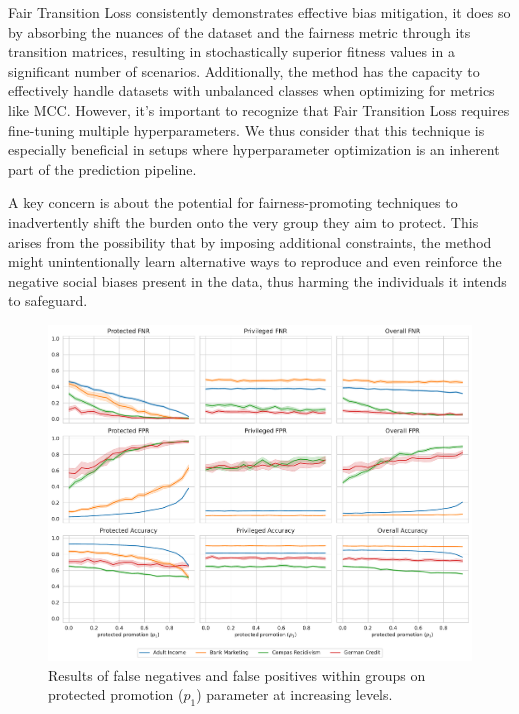 Fair Transition Loss consistently demonstrates effective bias mitigation, it does so by absorbing the nuances of the dataset and the fairness metric through its transition matrices, resulting in stochastically superior fitness values in a significant number of scenarios. Additionally, the method has the capacity to effectively handle datasets with unbalanced classes when optimizing for metrics like MCC. However, it's important to recognize that Fair Transition Loss requires fine-tuning multiple hyperparameters. We thus consider that this technique is especially beneficial in setups where hyperparameter optimization is an inherent part of the prediction pipeline.

A key concern is about the potential for fairness-promoting techniques to inadvertently shift the burden onto the very group they aim to protect. This arises from the possibility that by imposing additional constraints, the method might unintentionally learn alternative ways to reproduce and even reinforce the negative social biases present in the data, thus harming the individuals it intends to safeguard.

\begin{figure}[!ht]
\centering
\caption{Results of false negatives and false positives within groups on protected promotion ($p_1$) parameter at increasing levels.}
    \label{fig:ftl_sensibility_test}
    \includegraphics[width=1\linewidth]{images/ftl_sensibility_results.pdf}
\end{figure}

